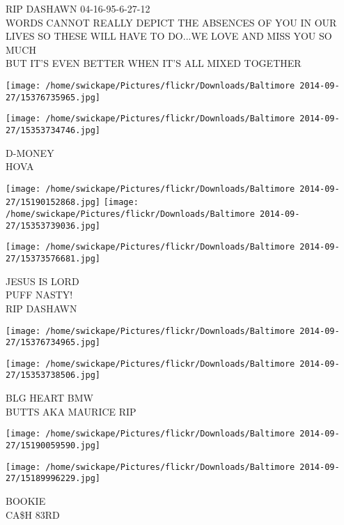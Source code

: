 \documentclass[10pt,letterpaper]{article}
\begin{document}
RIP DASHAWN 04{-}16{-}95{-}6{-}27{-}12\\
WORDS CANNOT REALLY DEPICT THE ABSENCES OF YOU IN OUR LIVES SO THESE WILL HAVE TO DO...WE LOVE AND MISS YOU SO MUCH\\
BUT IT'S EVEN BETTER WHEN IT'S ALL MIXED TOGETHER\\
\pagebreak

\texttt{[image: /home/swickape/Pictures/flickr/Downloads/Baltimore 2014-09-27/15376735965.jpg]}

\vspace{0.25in}
\texttt{[image: /home/swickape/Pictures/flickr/Downloads/Baltimore 2014-09-27/15353734746.jpg]}

D{-}MONEY\\
HOVA\\
\pagebreak

\texttt{[image: /home/swickape/Pictures/flickr/Downloads/Baltimore 2014-09-27/15190152868.jpg]}
\texttt{[image: /home/swickape/Pictures/flickr/Downloads/Baltimore 2014-09-27/15353739036.jpg]}

\vspace{0.25in}
\texttt{[image: /home/swickape/Pictures/flickr/Downloads/Baltimore 2014-09-27/15373576681.jpg]}

JESUS IS LORD\\
PUFF NASTY!\\
RIP DASHAWN\\
\pagebreak

\texttt{[image: /home/swickape/Pictures/flickr/Downloads/Baltimore 2014-09-27/15376734965.jpg]}

\vspace{0.25in}
\texttt{[image: /home/swickape/Pictures/flickr/Downloads/Baltimore 2014-09-27/15353738506.jpg]}

BLG HEART BMW\\
BUTTS AKA MAURICE RIP\\
\pagebreak

\texttt{[image: /home/swickape/Pictures/flickr/Downloads/Baltimore 2014-09-27/15190059590.jpg]}

\vspace{0.25in}
\texttt{[image: /home/swickape/Pictures/flickr/Downloads/Baltimore 2014-09-27/15189996229.jpg]}

BOOKIE\\
CA\$H 83RD\\
\pagebreak
\end{document}
